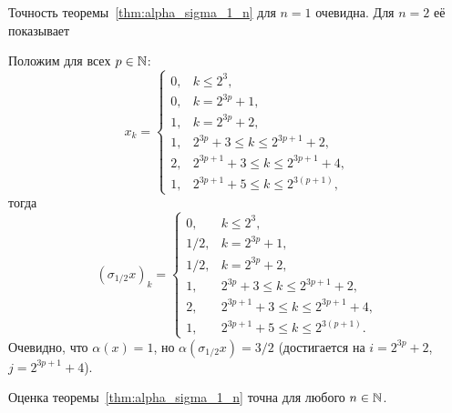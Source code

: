 Точность теоремы~\ref{thm:alpha_sigma_1_n} для $n=1$ очевидна.
Для $n=2$ её показывает
\begin{example}
	Положим для всех $p\in\mathbb{N}$:
	\begin{equation}
		x_k=\begin{cases}
			0, & k \leq 2^3, \\
			0, & k = 2^{3p}+1, \\
			1, & k = 2^{3p}+2, \\
			1, & 2^{3p}+3 \leq k \leq 2^{3p+1}+2, \\
			2, & 2^{3p+1}+3 \leq k \leq 2^{3p+1}+4, \\
			1, & 2^{3p+1}+5 \leq k \leq 2^{3(p+1)},
		\end{cases}
	\end{equation}
	тогда
	\begin{equation}
		(\sigma_{1/2}x)_k=\begin{cases}
			0, & k \leq 2^3, \\
			1/2, & k = 2^{3p}+1, \\
			1/2, & k = 2^{3p}+2, \\
			1, & 2^{3p}+3 \leq k \leq 2^{3p+1}+2, \\
			2, & 2^{3p+1}+3 \leq k \leq 2^{3p+1}+4, \\
			1, & 2^{3p+1}+5 \leq k \leq 2^{3(p+1)}.
		\end{cases}
	\end{equation}
	Очевидно, что $\alpha(x)=1$, но $\alpha(\sigma_{1/2}x)=3/2$
	(достигается на $i=2^{3p}+2$, $j=2^{3p+1}+4$).
\end{example}

\begin{hypothesis}
	Оценка теоремы~\ref{thm:alpha_sigma_1_n} точна для любого $n\in\mathbb{N}$.
\end{hypothesis}
